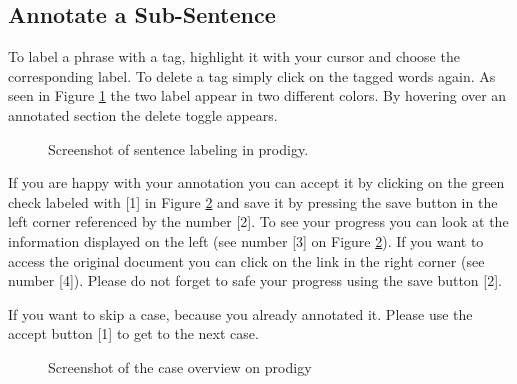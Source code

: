 \documentclass{article}
\begin{document}

\subsection{Annotate a Sub-Sentence}
To label a phrase with a tag, highlight it with your cursor and choose the corresponding label. To delete a tag simply click on the tagged words again. As seen in Figure \ref{sentence_annotation} the two label appear in two different colors. By hovering over an annotated section the delete toggle appears.

\begin{figure}[H]
     \caption{Screenshot of sentence labeling in prodigy.}
     \label{sentence_annotation}
\end{figure}


If you are happy with your annotation you can accept it by clicking on the green check labeled with [1] in Figure \ref{overview} and save it by pressing the save button in the left corner referenced by the number [2].
To see your progress you can look at the information displayed on the left (see number [3] on Figure \ref{overview}). If you want to access the original document you can click on the link in the right corner (see number [4]). Please do not forget to safe your progress using the save button [2].

If you want to skip a case, because you already annotated it. Please use the accept button [1] to get to the next case.
\pagebreak
\begin{figure}[h]
     \caption{Screenshot of the case overview on prodigy}
     \label{overview}
\end{figure}
\end{document}
